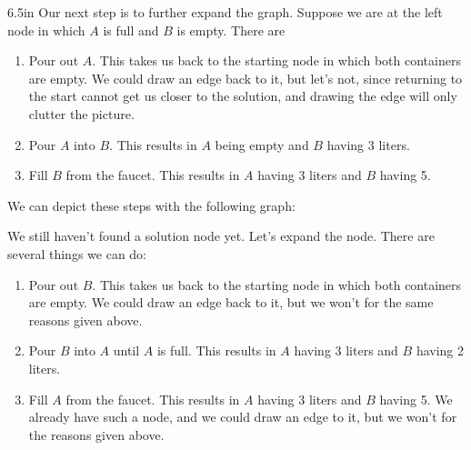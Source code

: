 \begin{prob}
\begin{responsebox}{6.5in}
        Our next step is to further expand the graph. Suppose we are at the
        left node in which $A$ is full and $B$ is empty. There are 
        \begin{enumerate}
            \item Pour out $A$. This takes us back to the starting node in
                which both containers are empty. We could draw an edge back
                to it, but let's not, since returning to the start cannot
                get us closer to the solution, and drawing the edge will
                only clutter the picture.
            \item Pour $A$ into $B$. This results in $A$ being empty and
                $B$ having 3 liters.
            \item Fill $B$ from the faucet. This
                results in $A$ having 3 liters and $B$ having 5.
        \end{enumerate}
        We can depict these steps with the following graph:
        \begin{center}
        \end{center}
        We still haven't found a solution node yet. Let's expand the  node.
        There are several things we can do:
        \begin{enumerate}
            \item Pour out $B$. This takes us back to the starting node in
                which both containers are empty. We could draw an edge back
                to it, but we won't for the same reasons given above.
            \item Pour $B$ into $A$ until $A$ is full. This results in $A$
                having 3 liters and $B$ having 2 liters.
            \item Fill $A$ from the faucet. This results in $A$ having 3
                liters and $B$ having 5. We already have such a node, and
                we could draw an edge to it, but we won't for the reasons
                given above.

\end{enumerate}
\end{responsebox}
\end{prob}
